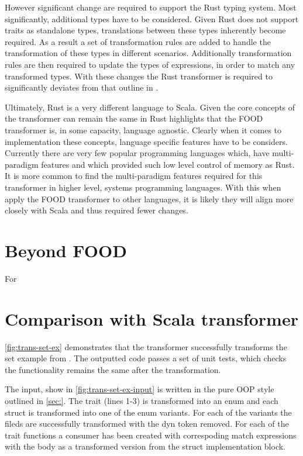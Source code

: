 \documentclass[ oneside,%
                    author={James Elgar},
                    degree={MEng},
                     title={Bidirectional transformer between functional and \\ object-oriented programming in Rust},
                  subtitle={}]{dissertation}
\begin{document}
However significant change are required to support the Rust typing system. Most significantly, additional types have to be considered. Given Rust does not support traits as standalone types, translations between these types inherently become required. As a result a set of transformation rules are added to handle the transformation of these types in different scenarios. Additionally transformation rules are then required to update the types of expressions, in order to match any transformed types. With these changes the Rust transformer is required to significantly deviates from  that outline in \cite{food}. 

Ultimately, Rust is a very different language to Scala. Given the core concepts of the transformer can remain the same in Rust highlights that the FOOD transformer is, in some capacity, language agnostic. Clearly when it comes to implementation these concepts, language specific features have to be considers. Currently there are very few popular programming languages which, have multi-paradigm features and which provided such low level control of memory as Rust. It is more common to find the multi-paradigm features required for this transformer in higher level, systems programming languages. With this when apply the FOOD transformer to other languages, it is likely they will align more closely with Scala and thus required fewer changes.

\section{Beyond FOOD} 

For

\section{Comparison with Scala transformer} 

\autoref{fig:trans-set-ex} demonstrates that the transformer successfully transforms the set example from \cite{food}. 
The outputted code passes a set of unit tests, which checks the functionality remains the same after the transformation.

The input, show in \autoref{fig:trans-set-ex-input} is written in the pure OOP style outlined in \autoref{sec:}. The trait (lines 1-3) is transformed into an enum and each struct is transformed into one of the enum variants. For each of the variants the fileds are successfully transformed with the dyn token removed. For each of the trait functions a consumer has been created with correspoding match expressions with the body as a transformed version from the struct implementation block.
\end{document}
